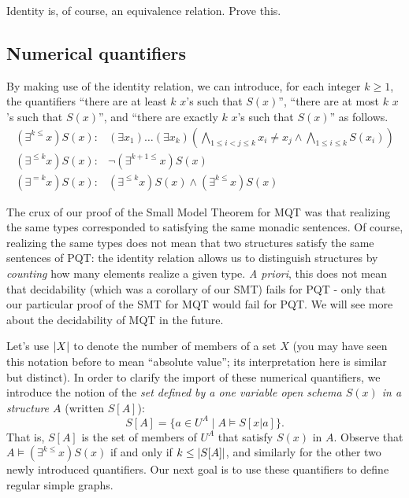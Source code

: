 \begin{aside}
    Identity is, of course, an equivalence relation. Prove this. 
\end{aside}

\subsection*{Numerical quantifiers}
By making use of the identity relation, we can introduce, for each integer $k\geq 1$, the quantifiers ``there are at least $k$ $x$'s such that $S(x)$'', ``there are at most $k$ $x$'s such that $S(x)$'', and ``there are exactly  $k$ $x$'s such that $S(x)$'' as follows.
\[
\begin{array}{ll}
(\exists^{k\leq}x)S(x):  & (\exists x_1)\ldots(\exists x_k)(\bigwedge_{1\leq i<j\leq k}x_i\neq x_j\wedge \bigwedge_{1\leq i\leq k}S(x_i))\\
(\exists^{\leq k}x)S(x): & \neg (\exists^{k+1\leq}x)S(x)\\
(\exists^{ = k}x)S(x): & (\exists^{\leq k}x)S(x)\wedge(\exists^{k\leq}x)S(x)
\end{array}
\]

\begin{aside}
    The crux of our proof of the Small Model Theorem for MQT was that realizing the same types corresponded to satisfying the same monadic sentences. Of course, realizing the same types does not mean that two structures satisfy the same sentences of PQT: the identity relation allows us to distinguish structures by \emph{counting} how many elements realize a given type. \emph{A priori}, this does not mean that decidability (which was a corollary of our SMT) fails for PQT - only that our particular proof of the SMT for MQT would fail for PQT. We will see more about the decidability of MQT in the future. 
\end{aside}

Let's use $\mbox{$|X|$}$ to denote the number of members of a set $X$ (you may have seen this notation before to mean ``absolute value''; its interpretation here is similar but distinct).    
In order to clarify the import of these  numerical quantifiers, we introduce the notion of the \emph{set defined by a one variable open schema $S(x)$ in a structure $A$} (written $S[A]$):
\[S[A]=\{a\in U^A\mid A\models S[x|a]\}.\] That is, $S[A]$ is the set of members of $U^A$ that satisfy $S(x)$ in $A$. Observe that $A\models(\exists^{k\leq}x)S(x)$ if and only if $k\leq\mbox{$|S[A]|$}$, and similarly for the other two newly introduced quantifiers. Our next goal is to use these quantifiers to define regular simple graphs.

